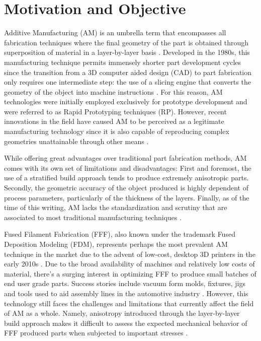 \documentclass[main.tex]{subfiles}
\begin{document}
\chapter{Motivation and Objective}

Additive Manufacturing (AM) is an umbrella term that encompasses all fabrication techniques where the final geometry of the part is obtained through superposition of material in a layer-by-layer basis \cite{Gibson2015}. Developed in the 1980s, this manufacturing technique permits immensely shorter part development cycles since the transition from a 3D computer aided design (CAD) to part fabrication only requires one intermediate step: the use of a slicing engine that converts the geometry of the object into machine instructions \cite{Gibson2015}. For this reason, AM technologies were initially employed exclusively for prototype development and were referred to as Rapid Prototyping techniques (RP). However, recent innovations in the field have caused AM to be perceived as a legitimate manufacturing technology since it is also capable of reproducing complex geometries unattainable through other means \cite{Gibson2015}.

While offering great advantages over traditional part fabrication methods, AM comes with its own set of limitations and disadvantages: First and foremost, the use of a stratified build approach tends to produce extremely anisotropic parts. Secondly, the geometric accuracy of the object produced is highly dependent of process parameters, particularly of the thickness of the layers. Finally, as of the time of this writing, AM lacks the standardization and scrutiny that are associated to most traditional manufacturing techniques \cite{Gibson2015}.  

Fused Filament Fabrication (FFF), also known under the trademark Fused Deposition Modeling (FDM\texttrademark), represents perhaps the most prevalent AM technique in the market due to the advent of low-cost, desktop 3D printers in the early 2010s \cite{Capote2017}. Due to the broad availability of machines and relatively low costs of material, there's a surging interest in optimizing FFF to produce small batches of end user grade parts. Success stories include vacuum form molds, fixtures, jigs and tools used to aid assembly lines in the automotive industry \cite{Hartman2014, VanHulle2017,deVries2017}. However, this technology still faces the challenges and limitations that currently affect the field of AM as a whole. Namely, anisotropy introduced through the layer-by-layer build approach makes it difficult to assess the expected mechanical behavior of FFF produced parts when subjected to important stresses \cite{Capote2017}.   

% 
%
%
%
\end{document}
